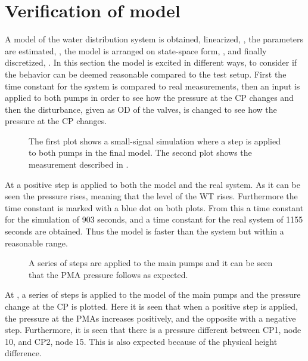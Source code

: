 \section{Verification of model}
\label{verification_of_model}

A model of the water distribution system is obtained, linearized, , the parameters are estimated, , the model is arranged on state-space form, , and finally discretized, . In this section the model is excited in different ways, to consider if the behavior can be deemed reasonable compared to the test setup. First the time constant for the system is compared to real measurements, then an input is applied to both pumps in order to see how the pressure at the CP changes and then the disturbance, given as OD of the valves, is changed to see how the pressure at the CP changes. 

\begin{figure}[H]
   \centering
    
    \caption{The first plot shows a small-signal simulation where a step is applied to both pumps in the final model. The second plot shows the measurement described in .}
    \label{simulation_time_constant}
\end{figure}

At  a positive step is applied to both the model and the real system. As it can be seen the pressure rises, meaning that the level of the WT rises. Furthermore the time constant is marked with a blue dot on both plots. From this a time constant for the simulation of 903 seconds, and a time constant for the real system of 1155 seconds are obtained. Thus the model is faster than the system but within a reasonable range.

\begin{figure}[H]
   \centering
    
    \caption{A series of steps are applied to the main pumps and it can be seen that the PMA pressure follows as expected.}
    \label{input_simulation}
\end{figure}

At , a series of steps is applied to the model of the main pumps and the pressure change at the CP is plotted. Here it is seen that when a positive step is applied, the pressure at the PMAs increases positively, and the opposite with a negative step. Furthermore, it is seen that there is a pressure different between CP1, node 10, and CP2, node 15. This is also expected because of the physical height difference.  

